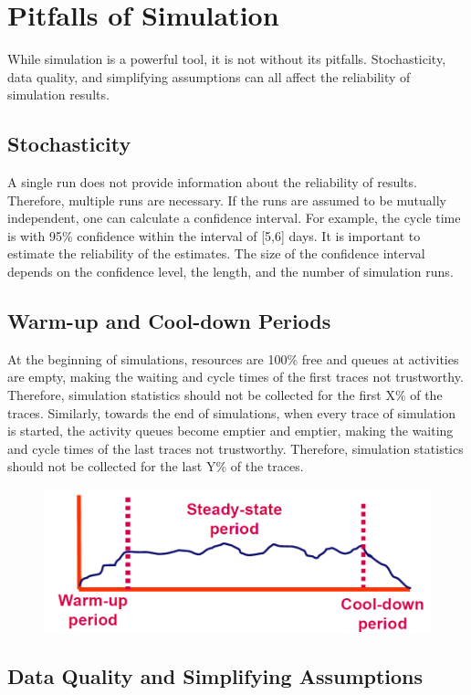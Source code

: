 \section{Pitfalls of Simulation}

While simulation is a powerful tool, it is not without its pitfalls. Stochasticity, data quality, and simplifying assumptions can all affect the reliability of simulation results.

\subsection{Stochasticity}

A single run does not provide information about the reliability of results. Therefore, multiple runs are necessary. If the runs are assumed to be mutually independent, one can calculate a confidence interval. For example, the cycle time is with 95\% confidence within the interval of [5,6] days. It is important to estimate the reliability of the estimates. The size of the confidence interval depends on the confidence level, the length, and the number of simulation runs.

\subsection{Warm-up and Cool-down Periods}

At the beginning of simulations, resources are 100\% free and queues at activities are empty, making the waiting and cycle times of the first traces not trustworthy. Therefore, simulation statistics should not be collected for the first X\% of the traces. Similarly, towards the end of simulations, when every trace of simulation is started, the activity queues become emptier and emptier, making the waiting and cycle times of the last traces not trustworthy. Therefore, simulation statistics should not be collected for the last Y\% of the traces.
\begin{figure}[h!]
    \centering
    \includegraphics[width=0.75\linewidth]{capitolo 10/9.png}
\end{figure}
\subsection{Data Quality and Simplifying Assumptions}

